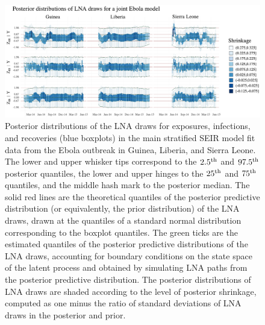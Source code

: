 \begin{figure}
	\begin{fullpage}
		\centering
		\includegraphics[width=\linewidth]{figures/ebola_joint_drawplots}
		\caption[Posterior distributions of LNA draws for the main stratified SEIR model fit to data from the West Africa Ebola outbreak.]{Posterior distributions of the LNA draws for exposures, infections, and recoveries (blue boxplots) in the main stratified SEIR model fit data from the Ebola outbreak in Guinea, Liberia, and Sierra Leone. The lower and upper whisker tips correspond to the $ 2.5^{\mathrm{th}} $ and $ 97.5^{\mathrm{th}} $ posterior quantiles, the lower and upper hinges to the $ 25^{\mathrm{th}} $ and $ 75^{\mathrm{th}} $ quantiles, and the middle hash mark to the posterior median. The solid red lines are the theoretical quantiles of the posterior predictive distribution (or equivalently, the prior distribution) of the LNA draws, drawn at the quantiles of a standard normal distribution corresponding to the boxplot quantiles. The green ticks are the estimated quantiles of the posterior predictive distributions of the LNA draws, accounting for boundary conditions on the state space of the latent process and obtained by simulating LNA paths from the posterior predictive distribution. The posterior distributions of LNA draws are shaded according to the level of posterior shrinkage, computed as one minus the ratio of standard deviations of LNA draws in the posterior and prior.}
		\label{fig:ebola_joint_drawplots}
	\end{fullpage}
\end{figure}

